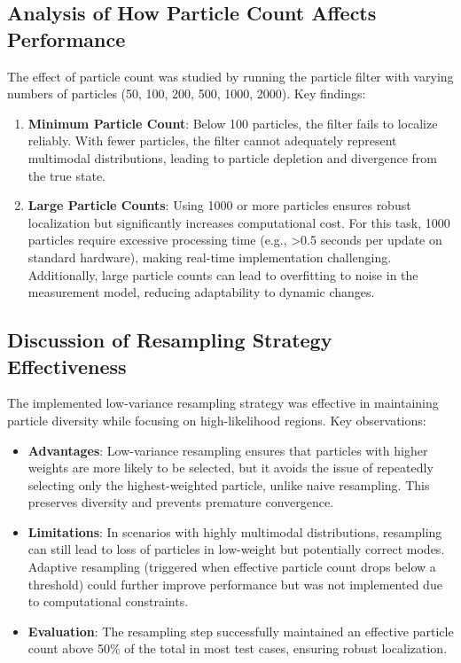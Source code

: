 \documentclass[11pt]{article}
\begin{document}
\subsection{Analysis of How Particle Count Affects Performance}
The effect of particle count was studied by running the particle filter with varying numbers of particles (50, 100, 200, 500, 1000, 2000). Key findings:
\begin{enumerate}
    \item \textbf{Minimum Particle Count}: Below 100 particles, the filter fails to localize reliably. With fewer particles, the filter cannot adequately represent multimodal distributions, leading to particle depletion and divergence from the true state.
    \item \textbf{Large Particle Counts}: Using 1000 or more particles ensures robust localization but significantly increases computational cost. For this task, 1000 particles require excessive processing time (e.g., >0.5 seconds per update on standard hardware), making real-time implementation challenging. Additionally, large particle counts can lead to overfitting to noise in the measurement model, reducing adaptability to dynamic changes.
\end{enumerate}

\subsection{Discussion of Resampling Strategy Effectiveness}
The implemented low-variance resampling strategy was effective in maintaining particle diversity while focusing on high-likelihood regions. Key observations:
\begin{itemize}
    \item \textbf{Advantages}: Low-variance resampling ensures that particles with higher weights are more likely to be selected, but it avoids the issue of repeatedly selecting only the highest-weighted particle, unlike naive resampling. This preserves diversity and prevents premature convergence.
    \item \textbf{Limitations}: In scenarios with highly multimodal distributions, resampling can still lead to loss of particles in low-weight but potentially correct modes. Adaptive resampling (triggered when effective particle count drops below a threshold) could further improve performance but was not implemented due to computational constraints.
    \item \textbf{Evaluation}: The resampling step successfully maintained an effective particle count above 50\% of the total in most test cases, ensuring robust localization.
\end{itemize}
\end{document}
